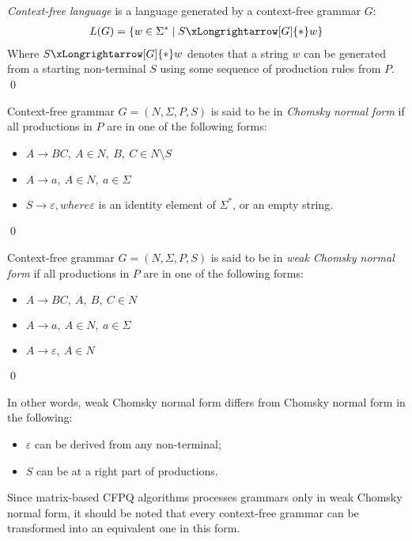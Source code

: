 \begin{definition} \emph{Context-free language} is a language generated by a context-free grammar $G$:
\begin{align*}
     L(G) = \{w \in \Sigma^* \mid S \xLongrightarrow[G]{*} w \} 
\end{align*}
Where $S \xLongrightarrow[G]{*} w$  denotes that a string $w$ can be generated from a starting non-terminal $S$ using some sequence of production rules from $P$. \qed
\end{definition}

\begin{definition} Context-free grammar $G = (N, \Sigma, P, S)$ is said to be in \emph{Chomsky normal form} if all productions in $P$ are in one of the following forms:
    \begin{itemize}
        \item $A \rightarrow BC,~A \in N,~B,~C \in N \setminus S$
        \item  $A \rightarrow a,~A \in N,~a \in \Sigma$
        \item $S \rightarrow \varepsilon, where \varepsilon$ is an identity element of $\Sigma^*$, or an empty string.
    \end{itemize}\qed
\end{definition}

\begin{definition} Context-free grammar $G = (N, \Sigma, P, S)$ is said to be in \emph{weak Chomsky normal form} if all productions in $P$ are in one of the following forms:
    \begin{itemize}
        \item $A \rightarrow BC,~A,~B,~C \in N$
        \item  $A \rightarrow a,~A \in N,~a \in \Sigma$
        \item $A \rightarrow \varepsilon,~A \in N$
    \end{itemize} \qed
\end{definition}

In other words, weak Chomsky normal form differs from Chomsky normal form in the following:
\begin{itemize}
    \item $\varepsilon$ can be derived from any non-terminal;
    \item $S$ can be at a right part of productions.
\end{itemize}

Since matrix-based CFPQ algorithms processes grammars only in weak Chomsky normal form, it should be noted that every context-free grammar can be transformed into an equivalent one in this form. 

